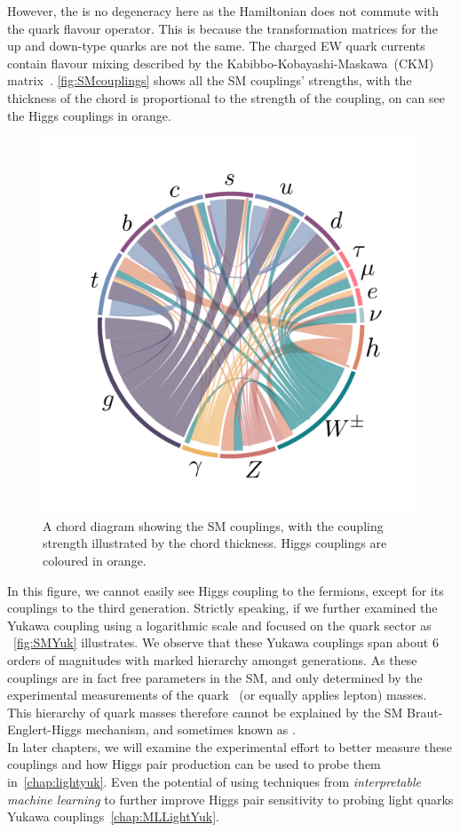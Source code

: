 However, the is no degeneracy here as the Hamiltonian does not commute with the quark flavour operator. This is because the transformation matrices for the up and down-type quarks are not the same.  The charged EW quark currents contain flavour mixing described by the Kabibbo-Kobayashi-Maskawa~(CKM) matrix~\cite{PhysRevLett.10.531,10.1143/PTP.49.652}. 
\autoref{fig:SMcouplings} shows all the SM couplings' strengths, with the thickness of the chord is proportional to the strength of the coupling, on can see the Higgs couplings in orange. 
\begin{figure}[htpb!]
    \centering
    \includegraphics[width=\linewidth]{./figures/SM}
    	\caption{A chord diagram showing the SM couplings, with the coupling strength illustrated by the chord thickness. Higgs couplings are coloured in orange.} \label{fig:SMcouplings}
\end{figure}
In this figure, we cannot easily see Higgs coupling to the fermions, except for its couplings to the third generation. Strictly speaking, if we further examined the Yukawa coupling using a logarithmic scale and focused on the quark sector as ~\autoref{fig:SMYuk} illustrates. We observe that these Yukawa couplings span about 6 orders of magnitudes with marked hierarchy amongst generations.  As these couplings are in fact free parameters in the SM, and only determined by the experimental measurements of the quark ~(or equally applies lepton) masses. This hierarchy of quark masses therefore cannot be explained by the SM Braut-Englert-Higgs mechanism, and sometimes known as .  \\ In later chapters, we will examine the experimental effort to better measure these couplings and how Higgs pair production can be used to probe them in~\autoref{chap:lightyuk}. Even the potential of using techniques from \emph{interpretable machine learning} to further improve Higgs pair sensitivity to probing light quarks Yukawa couplings~\autoref{chap:MLLightYuk}.

